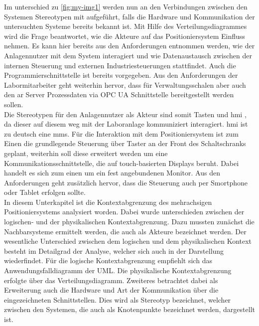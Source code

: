 \documentclass[../../../Bachelorarbeit.tex]{subfiles}
\begin{document}
Im unterschied zu \autoref{fig:my-img1} werden nun an den Verbindungen zwischen den Systemen Stereotypen mit aufgeführt, falls die Hardware und Kommunikation der untersuchten Systeme bereits bekannt ist. Mit Hilfe des Verteilungsdiagrammes wird die Frage beantwortet, wie die Akteure auf das Positioniersystem Einfluss nehmen. Es kann hier bereits aus den Anforderungen entnommen werden, wie der Anlagennutzer mit dem System interagiert und wie Datenaustausch zwischen der internen Steuerung und externen Industriesteuerungen stattfindet. Auch die Programmierschnittstelle ist bereits vorgegeben. Aus den Anforderungen der Labormitarbeiter geht weiterhin hervor, dass für Verwaltungsschalen aber auch den \ac{ar} Server Prozessdaten via OPC UA Schnittstelle bereitgestellt werden sollen.\\
Die Stereotypen für \zB den Anlagennutzer als Akteur sind somit \glqq Tasten\grqq{} und \glqq \acs{hmi} \grqq{}, da dieser auf diesem weg mit der Laboranlage kommuniziert \bzw interagiert. \ac{hmi} ist zu deutsch eine \ac{mms}. Für die Interaktion mit dem Positioniersystem ist zum Einen die grundlegende Steuerung über Taster an der Front des Schaltschranks geplant, weiterhin soll diese erweitert werden um eine Kommunikationsschnittstelle, die auf touch-basierten Displays beruht. Dabei handelt es sich zum einen um ein fest angebundenen Monitor. Aus den Anforderungen geht zusätzlich hervor, dass die Steuerung auch per Smortphone oder Tablet erfolgen sollte.\\
\bigskip
\newline
In diesem Unterkapitel ist die Kontextabgrenzung des mehrachsigen Positioniersystems analysiert worden. Dabei wurde unterschieden zwischen der logischen- und der physikalischen Kontextabgrenzung. Dazu mussten zunächst die Nachbarsysteme ermittelt werden, die auch als Akteure bezeichnet werden. Der wesentliche Unterschied zwischen dem logischen und dem physikalischen Kontext besteht im Detailgrad der Analyse, welcher sich auch in der Darstellung wiederfindet. Für die logische Kontextabgrenzung empfiehlt sich das Anwendungsfalldiagramm der UML. Die physikalische Kontextabgrenzung erfolgte über das Verteilungsdiagramm. Zweiteres betrachtet dabei als Erweiterung auch die Hardware und Art der Kommunikation über die eingezeichneten Schnittstellen. Dies wird als Stereotyp bezeichnet, welcher zwischen den Systemen, die auch als Knotenpunkte bezeichnet werden, dargestellt ist.
\end{document}
